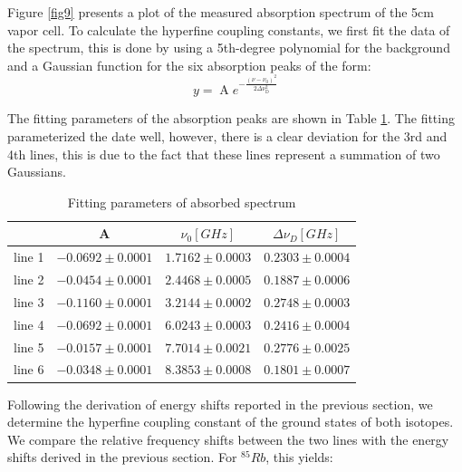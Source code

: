 \documentclass[12pt]{article}
\begin{document}
Figure \ref{fig9} presents a plot of the measured absorption spectrum of the 5cm vapor cell. To calculate the hyperfine coupling constants, we first fit the data of the spectrum, this is done by using a 5th-degree polynomial for the background and a Gaussian function for the six absorption peaks of the form:
\begin{equation}
    y=\operatorname{A} e^{-\frac{\left(\nu-\nu_0\right)^2}{2 \Delta \nu_{\mathrm{D}}^2}}
    \label{fitting}
\end{equation}

The fitting parameters of the absorption peaks are shown in Table \ref{tab2}. The fitting parameterized the date well, however, there is a clear deviation for the 3rd and 4th lines, this is due to the fact that these lines represent a summation of two Gaussians. 

\begin{table}[H]
    \centering
    \begin{tabular}{c|c|c|c}
         \hline
         \hline
          & A & $\nu_0 [GHz]$ & $\Delta\nu_D [GHz]$   \\
         \hline
         line 1 & $-0.0692 \pm  0.0001$ & $1.7162 \pm 0.0003$ & $0.2303 \pm 0.0004$ \\

         line 2 & $-0.0454 \pm 0.0001 $ & $2.4468 \pm 0.0005$ & $0.1887 \pm 0.0006$ \\   

         line 3 & $-0.1160 \pm 0.0001 $ & $3.2144 \pm 0.0002$ & $0.2748 \pm 0.0003$ \\ 

          line 4 & $-0.0692 \pm 0.0001 $ & $6.0243 \pm 0.0003$ & $0.2416 \pm 0.0004$ \\

          line 5 & $-0.0157 \pm 0.0001 $ & $7.7014 \pm 0.0021$ & $0.2776 \pm 0.0025$ \\

          line 6 & $-0.0348 \pm 0.0001 $ & $8.3853 \pm 0.0008$ & $0.1801 \pm 0.0007$ \\
         
         \hline
    \end{tabular}
    \caption{Fitting parameters of absorbed spectrum}
    \label{tab2}
\end{table}
Following the derivation of energy shifts reported in the previous section, we determine the hyperfine coupling constant of the ground states of both isotopes.   
We compare the relative frequency shifts between the two lines with the energy shifts derived in the previous section. For $^{85}Rb$, this yields:
\end{document}

